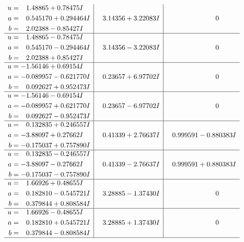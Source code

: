 \documentclass[1p]{elsarticle_modified}
\theoremstyle{definition}
\begin{document}
$$\begin{array}{c|c|c}
\begin{aligned}
u &= \phantom{-}1.48865 + 0.78475 I \\
a &= \phantom{-}0.545170 + 0.294464 I \\
b &= \phantom{-}2.02388 - 0.85427 I\end{aligned}
 & \phantom{-}3.14356 + 3.22083 I & \phantom{-0.000000 } 0 \\ \hline\begin{aligned}
u &= \phantom{-}1.48865 - 0.78475 I \\
a &= \phantom{-}0.545170 - 0.294464 I \\
b &= \phantom{-}2.02388 + 0.85427 I\end{aligned}
 & \phantom{-}3.14356 - 3.22083 I & \phantom{-0.000000 } 0 \\ \hline\begin{aligned}
u &= -1.56146 + 0.69154 I \\
a &= -0.089957 - 0.621770 I \\
b &= \phantom{-}0.092627 + 0.952473 I\end{aligned}
 & \phantom{-}0.23657 + 6.97702 I & \phantom{-0.000000 } 0 \\ \hline\begin{aligned}
u &= -1.56146 - 0.69154 I \\
a &= -0.089957 + 0.621770 I \\
b &= \phantom{-}0.092627 - 0.952473 I\end{aligned}
 & \phantom{-}0.23657 - 6.97702 I & \phantom{-0.000000 } 0 \\ \hline\begin{aligned}
u &= \phantom{-}0.132835 + 0.246557 I \\
a &= -3.88097 + 0.27662 I \\
b &= -0.175037 + 0.757890 I\end{aligned}
 & \phantom{-}0.41339 + 2.76637 I & \phantom{-}0.999591 - 0.880383 I \\ \hline\begin{aligned}
u &= \phantom{-}0.132835 - 0.246557 I \\
a &= -3.88097 - 0.27662 I \\
b &= -0.175037 - 0.757890 I\end{aligned}
 & \phantom{-}0.41339 - 2.76637 I & \phantom{-}0.999591 + 0.880383 I \\ \hline\begin{aligned}
u &= \phantom{-}1.66926 + 0.48655 I \\
a &= \phantom{-}0.182810 - 0.545721 I \\
b &= \phantom{-}0.379844 + 0.808584 I\end{aligned}
 & \phantom{-}3.28885 - 1.37430 I & \phantom{-0.000000 } 0 \\ \hline\begin{aligned}
u &= \phantom{-}1.66926 - 0.48655 I \\
a &= \phantom{-}0.182810 + 0.545721 I \\
b &= \phantom{-}0.379844 - 0.808584 I\end{aligned}
 & \phantom{-}3.28885 + 1.37430 I & \phantom{-0.000000 } 0\\
 \hline 
 \end{array}$$\newpage
\end{document}
